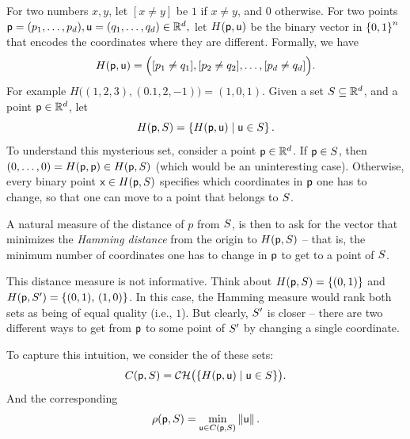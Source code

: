 For two numbers $x,y$, let $[x\neq y]$ be $1$ if $x \neq y$, and $0$
otherwise.  For two points
\begin{math}
    \pnt = (\pntCoord_1, \ldots, \pntCoord_d),%
    \pntA = (\pntCoordA_1, \ldots, \pntCoordA_d) \in \Re^d,
\end{math}
let $H(\mathsf{p},\mathsf{u})$ be the binary vector in $\left\{ {0,1} \right\}^n$ that encodes
the coordinates where they are different. Formally, we have
\begin{equation}
  H(\pnt,\pntA)%
  =%
  \pth{\Bigl. [\pntCoord_1 \neq \pntCoordA_1],
  [\pntCoord_2 \neq \pntCoordA_2], \ldots,
  [\pntCoord_d \neq \pntCoordA_d]}.
\end{equation}
For example $H\bigl( (1,2,3), (0.1,2,-1) \bigr) = (1,0,1)$.  Given a
set $S \subseteq \mathbb{R}^d$, and a point $\mathsf{p} \in \mathbb{R}^d$, let
\begin{equation}
    \HSetY{\pnt}{\SetA} = \Set{H(\pnt,\pntA)}{\pntA \in \SetA}.%
    \eqlab{t:c:change}%
\end{equation}
To understand this mysterious set, consider a point $\mathsf{p} \in \mathbb{R}^d$.
If $\mathsf{p} \in S$, then
$(0, \ldots, 0) = H(\pnt,\pnt) \in \HSetY{\pnt}{\SetA}$ (which would
be an uninteresting case). Otherwise, every binary point
$\pntC \in \HSetY{\pnt}{\SetA} $ specifies which coordinates in $\mathsf{p}$
one has to change, so that one can move to a point that belongs to
$S$.

A natural measure of the distance of $p$ from $S$, is then to ask
for the vector that minimizes the \emph{Hamming distance} from the
origin to $\HSetY{\pnt}{\SetA}$ -- that is, the minimum number of
coordinates one has to change in $\mathsf{p}$ to get to a point of
$S$.

This distance measure is not informative. Think about
$\HSetY{\pnt}{\SetA} = \brc{(0,1) }$ and
$\HSetY{\pnt}{\SetA'}= \brc{(0,1), \, (1,0)}$. In this case, the
Hamming measure would rank both sets as being of equal quality (i.e.,
$1$). But clearly, $S'$ is closer -- there are two different ways
to get from $\mathsf{p}$ to some point of $S'$ by changing a single
coordinate.

To capture this intuition, we consider the  of
these sets:
\begin{align*}
  \CHSetY{\pnt}{\SetA} = \CHX{ \bigl.\Set{H(\pnt,\pntA)}{\pntA \in \SetA}}.
\end{align*}
\newcommand{\distTY}[2]{\rho\pth{#1, #2}}%
\newcommand{\distTSqY}[2]{\rho^2\pth{#1, #2}}%
And the corresponding 
\begin{equation}
    \distTY{\pnt}{\SetA} = \min_{\pntA \in \CHSetY{\pnt}{\SetA}}
    \norm{\pntA}.
\end{equation}

